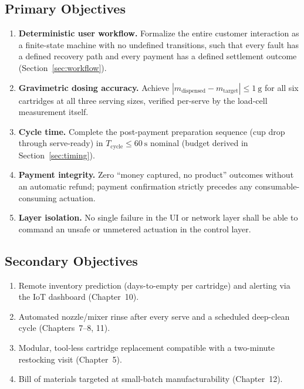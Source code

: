 \subsection{Primary Objectives}
\begin{enumerate}[label=\textbf{O\arabic*.}, itemsep=2pt]
  \item \textbf{Deterministic user workflow.} Formalize the entire customer
        interaction as a finite-state machine with no undefined transitions,
        such that every fault has a defined recovery path and every payment
        has a defined settlement outcome (Section~\ref{sec:workflow}).
  \item \textbf{Gravimetric dosing accuracy.} Achieve
        $|m_{\text{dispensed}} - m_{\text{target}}| \le \SI{1}{\gram}$ for
        all six cartridges at all three serving sizes, verified per-serve by
        the load-cell measurement itself.
  \item \textbf{Cycle time.} Complete the post-payment preparation sequence
        (cup drop through serve-ready) in $T_{\text{cycle}} \le
        \SI{60}{\second}$ nominal (budget derived in
        Section~\ref{sec:timing}).
  \item \textbf{Payment integrity.} Zero ``money captured, no product''
        outcomes without an automatic refund; payment confirmation strictly
        precedes any consumable-consuming actuation.
  \item \textbf{Layer isolation.} No single failure in the UI or network
        layer shall be able to command an unsafe or unmetered actuation in
        the control layer.
\end{enumerate}

\subsection{Secondary Objectives}
\begin{enumerate}[label=\textbf{S\arabic*.}, itemsep=2pt]
  \item Remote inventory prediction (days-to-empty per cartridge) and
        alerting via the IoT dashboard (Chapter~10).
  \item Automated nozzle/mixer rinse after every serve and a scheduled
        deep-clean cycle (Chapters~7--8, 11).
  \item Modular, tool-less cartridge replacement compatible with a
        two-minute restocking visit (Chapter~5).
  \item Bill of materials targeted at small-batch manufacturability
        (Chapter~12).
\end{enumerate}

